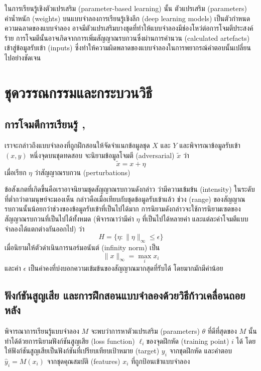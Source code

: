 \documentclass{cpepaper}
\begin{document}
ในการเรียนรู้เชิงตัวแปรเสริม (parameter-based learning) นั้น ตัวแปรเสริม (parameters) ค่าน้ำหนัก (weights) บนแบบจำลองการเรียนรู้เชิงลึก (deep learning models) เป็นตัวกำหนดความฉลาดของแบบจำลอง อาจมีตัวแปรเสริมบางชุดที่ทำให้แบบจำลองมีช่องโหว่ต่อการโจมตีประสงค์ร้าย การโจมตีนั้นอาจเกิดจากการเพิ่มสัญญาณรบกวนซึ่งผ่านการคำนวน (calculated artefacts) เข้าสู่ข้อมูลรับเข้า (inputs) ซึ่งทำให้ความผิดพลาดของแบบจำลองในการพยากรณ์คำตอบนั้นเปลี่ยนไปอย่างชัดเจน

\section{ชุดวรรณกรรมและกระบวนวิธี}

\subsection{การโจมตีการเรียนรู้ \cite{Goodfellow-et-al-2016}, \cite{kolter_madry}}

เราจะกล่าวถึงแบบจำลองที่ถูกฝึกสอนให้จัดจำแนกข้อมูลชุด $X$ และ $Y$ และพิจารณาข้อมูลรับเข้า $(x, y)$ หนึ่งจุดบนชุดทดสอบ จะนิยามข้อมูลโจมตี (adversarial) $\tilde{x}$ ว่า
\begin{equation}
    \tilde{x} = x + \eta
\end{equation}
เมื่อเรียก $\eta$ ว่าสัญญาณรบกวน (perturbations)

ข้อสังเกตที่เกิดขึ้นคือเราอาจนิยามชุดสัญญาณรบกวนดังกล่าว ว่ามีความเข้มข้น (intensity) ในระดับที่ต่ำกว่าตามนุษย์จะมองเห็น กล่าวคือเมื่อเทียบกับชุดข้อมูลรับเข้าแล้ว ช่วง (range) ของสัญญาณรบกวนนั้นน้อยกว่าช่วงของข้อมูลรับเข้าที่เป็นไปได้มาก การนิยามดังกล่าวจะใช้การนิยามเซตของสัญญาณรบกวนที่เป็นไปได้ทั้งหมด (พิจารณาว่ามีค่า $\eta$ ที่เป็นไปได้หลายค่า และแต่ละค่าโจมตีแบบจำลองได้แตกต่างกันออกไป) ว่า
\begin{equation}
    H = \{ \eta: \|\eta\|_\infty \leq \epsilon\}
    \label{perturbation-set}
\end{equation}
เมื่อนิยามให้ตัวดำเนินการนอร์มอนันต์ (infinity norm) เป็น
\begin{equation}
    \|x\|_\infty = \max_i{x_i}
\end{equation}
และค่า $\epsilon$ เป็นค่าคงที่บ่งบอกความเข้มข้นของสัญญาณมากสุดที่รับได้ โดยมากมักมีค่าน้อย

\subsection{ฟังก์ชันสูญเสีย และการฝึกสอนแบบจำลองด้วยวิธีก้าวเคลื่อนถอยหลัง}
พิจารณาการเรียนรู้แบบจำลอง $M$ จะพบว่าการหาตัวแปรเสริม (parameters) $\theta$ ที่ดีที่สุดของ $M$ นั้นทำได้ด้วยการนิยามฟังก์ชันสูญเสีย (loss function) $\ell_i $ของจุดฝึกหัด (training point) $i$ ได้ โดยให้ฟังก์ชันสูญเสียเป็นฟังก์ชันที่เปรียบเทียบเป้าหมาย (target) $y_i$ จากชุดฝึกหัด และคำตอบ $\hat{y}_i = M(x_i)$ จากชุดคุณสมบัติ (features) $x_i$ ที่ถูกป้อนเข้าแบบจำลอง
\end{document}
